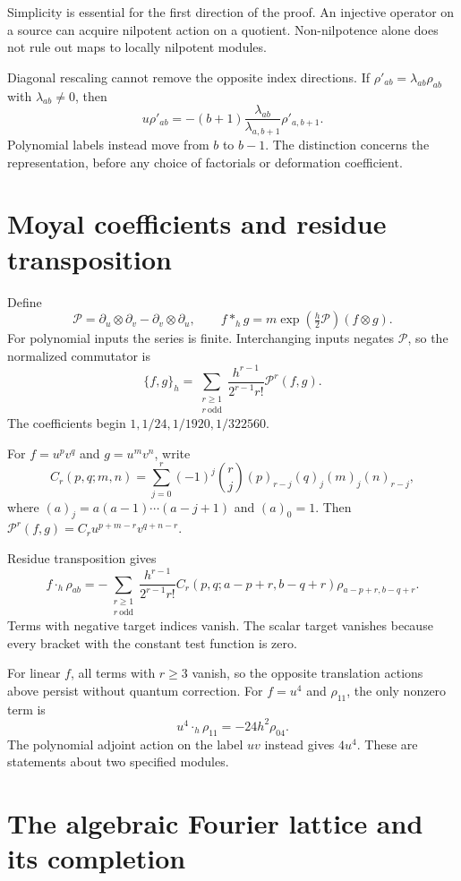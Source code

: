 Simplicity is essential for the first direction of the proof.
An injective operator on a source can acquire nilpotent action
on a quotient. Non-nilpotence alone does not rule out maps to
locally nilpotent modules.

Diagonal rescaling cannot remove the opposite index directions.
If $\rho'_{ab}=\lambda_{ab}\rho_{ab}$ with $\lambda_{ab}\ne0$, then
\[
 u\rho'_{ab}=-(b+1)\frac{\lambda_{ab}}{\lambda_{a,b+1}}
                       \rho'_{a,b+1}.
\]
Polynomial labels instead move from $b$ to $b-1$. The
distinction concerns the representation, before any choice of
factorials or deformation coefficient.

\section{Moyal coefficients and residue transposition}

Define
\[
 \mathcal P=\partial_u\otimes\partial_v
                   -\partial_v\otimes\partial_u,
 \qquad f*_h g=m\exp(\tfrac h2\mathcal P)(f\otimes g).
\]
For polynomial inputs the series is finite. Interchanging inputs
negates $\mathcal P$, so the normalized commutator is
\[
 \{f,g\}_h=
 \sum_{\substack{r\geq1\\r\ \mathrm{odd}}}
       \frac{h^{r-1}}{2^{r-1}r!}\mathcal P^r(f,g).
\]
The coefficients begin $1,1/24,1/1920,1/322560$.

For $f=u^pv^q$ and $g=u^mv^n$, write
\[
 C_r(p,q;m,n)=\sum_{j=0}^r(-1)^j\binom rj
                  (p)_{r-j}(q)_j(m)_j(n)_{r-j},
\]
where $(a)_j=a(a-1)\cdots(a-j+1)$ and $(a)_0=1$.
Then $\mathcal P^r(f,g)=C_r u^{p+m-r}v^{q+n-r}$.

Residue transposition gives
\[
 f\cdot_h\rho_{ab}=
 -\sum_{\substack{r\geq1\\r\ \mathrm{odd}}}
 \frac{h^{r-1}}{2^{r-1}r!}
 C_r(p,q;a-p+r,b-q+r)\rho_{a-p+r,b-q+r}.
\]
Terms with negative target indices vanish. The scalar target
vanishes because every bracket with the constant test function
is zero.

For linear $f$, all terms with $r\geq3$ vanish, so
the opposite translation actions above persist without quantum
correction. For $f=u^4$ and $\rho_{11}$, the only nonzero term is
\[
 u^4\cdot_h\rho_{11}=-24h^2\rho_{04}.
\]
The polynomial adjoint action on the label $uv$ instead gives
$4u^4$. These are statements about two specified modules.

\section{The algebraic Fourier lattice and its completion}

